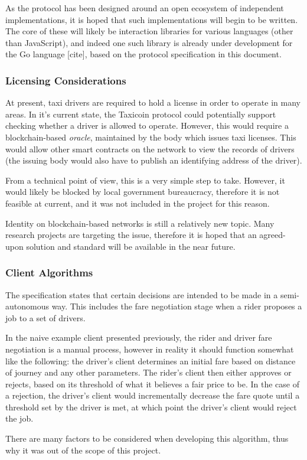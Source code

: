 As the protocol has been designed around an open ecosystem of independent implementations, it is hoped that such implementations will begin to be written. The core of these will likely be interaction libraries for various languages (other than JavaScript), and indeed one such library is already under development for the Go language [cite], based on the protocol specification in this document.

\subsubsection{Licensing Considerations}

At present, taxi drivers are required to hold a license in order to operate in many areas. In it's current state, the Taxicoin protocol could potentially support checking whether a driver is allowed to operate. However, this would require a blockchain-based \textit{oracle}, maintained by the body which issues taxi licenses. This would allow other smart contracts on the network to view the records of drivers (the issuing body would also have to publish an identifying address of the driver).

From a technical point of view, this is a very simple step to take. However, it would likely be blocked by local government bureaucracy, therefore it is not feasible at current, and it was not included in the project for this reason.

Identity on blockchain-based networks is still a relatively new topic. Many research projects are targeting the issue, therefore it is hoped that an agreed-upon solution and standard will be available in the near future.

\subsubsection{Client Algorithms}

The specification states that certain decisions are intended to be made in a semi-autonomous way. This includes the fare negotiation stage when a rider proposes a job to a set of drivers.

In the naive example client presented previously, the rider and driver fare negotiation is a manual process, however in reality it should function somewhat like the following: the driver's client determines an initial fare based on distance of journey and any other parameters. The rider's client then either approves or rejects, based on its threshold of what it believes a fair price to be. In the case of a rejection, the driver's client would incrementally decrease the fare quote until a threshold set by the driver is met, at which point the driver's client would reject the job.

There are many factors to be considered when developing this algorithm, thus why it was out of the scope of this project.
